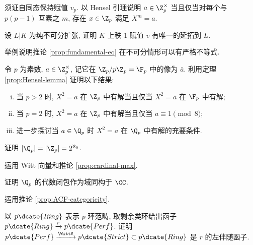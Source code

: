 \begin{Exercises}
	\begin{hint}
		须证自同态保持赋值 $v_p$. 以 Hensel 引理说明 $a \in \Z_p^\times$ 当且仅当对每个与 $p(p-1)$ 互素之 $m$, 存在 $x \in \Z_p$ 满足 $X^m=a$.
	\end{hint}
	\item 设 $L|K$ 为纯不可分扩张, 证明 $K$ 上秩 $1$ 赋值 $v$ 有唯一的延拓到 $L$.
	\item 举例说明推论 \ref{prop:fundamental-eq} 在不可分情形可以有严格不等式.
	\item 令 $p$ 为素数, $a \in \Z_p^\times$, 记它在 $\Z_p/p\Z_p = \F_p$ 中的像为 $\bar{a}$. 利用定理 \ref{prop:Hensel-lemma} 证明以下结果:
		\begin{enumerate}[(i)]
			\item 当 $p > 2$ 时, $X^2=a$ 在 $\Z_p$ 中有解当且仅当 $X^2=\bar{a}$ 在 $\F_p$ 中有解;
			\item 当 $p=2$ 时, $X^2=a$ 在 $\Z_p$ 中有解当且仅当 $a \equiv 1 \pmod 8$;
			\item 进一步探讨当 $a \in \Q_p$ 时 $X^2=a$ 在 $\Q_p$ 中有解的充要条件.
		\end{enumerate}
	\item 证明 $|\Q_p| = |\Z_p| = 2^{\aleph_0}$. \begin{hint}运用 Witt 向量和推论 \ref{prop:cardinal-max}.\end{hint}
	\item 证明 $\Q_p$ 的代数闭包作为域同构于 $\CC$. \begin{hint}运用推论 \ref{prop:ACF-categoricity}.\end{hint}
	\item 以 $p\dcate{Ring}$ 表示 $p$-环范畴, 取剩余类环给出函子 $p\dcate{Ring} \xrightarrow{r} p\dcate{Perf}$. 证明 $p\dcate{Perf} \xrightarrow{\WittV} p\dcate{Strict} \subset p\dcate{Ring}$ 是 $r$ 的左伴随函子.
\end{Exercises}